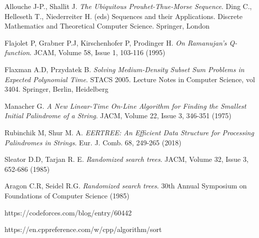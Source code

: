 \begin{thebibliography}{99}
 Allouche J-P., Shallit J. \textit{The Ubiquitous Prouhet-Thue-Morse Sequence}. Ding C., Helleseth T., Niederreiter H. (eds) Sequences and their Applications. Discrete Mathematics and Theoretical Computer Science. Springer, London

\newpage

 Flajolet P, Grabner P.J, Kirschenhofer P, Prodinger H. \textit{On Ramanujan's Q-function}. JCAM, Volume 58, Issue 1, 103-116 (1995)

 Flaxman A.D, Przydatek B. \textit{Solving Medium-Density Subset Sum Problems
in Expected Polynomial Time}. STACS 2005. Lecture Notes in Computer Science, vol 3404. Springer, Berlin, Heidelberg

 Manacher G. \textit{A New Linear-Time On-Line Algorithm for Finding the Smallest Initial Palindrome of a String}. JACM, Volume 22, Issue 3, 346-351 (1975)

 Rubinchik M, Shur M. A. \textit{EERTREE: An Efficient Data Structure for Processing Palindromes in Strings}. Eur. J. Comb. 68, 249-265 (2018)

 Sleator D.D, Tarjan R. E. \textit{Randomized search trees}. JACM, Volume 32, Issue 3, 652-686 (1985)

 Aragon C.R, Seidel R.G. \textit{Randomized search trees}. 30th Annual Symposium on Foundations of Computer Science (1985)

 https://codeforces.com/blog/entry/60442

 https://en.cppreference.com/w/cpp/algorithm/sort

\end{thebibliography}

